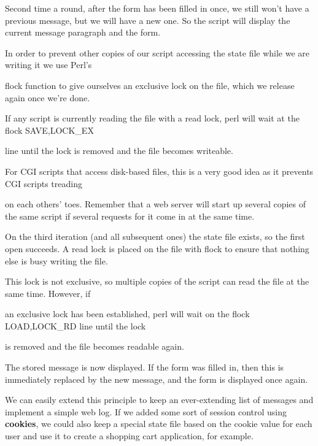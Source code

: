 \documentclass[a4paper,11pt]{book}
\begin{document}
\noindent 

\noindent Second time a round, after the form has been filled in once, we still won't have a previous message, but we will have a new one. So the script will display the current message paragraph and the form.

\noindent 

\noindent In order to prevent other copies of our script accessing the state file while we are writing it we use Perl's

\noindent flock function to give ourselves an exclusive lock on the file, which we release again once we're done.

\noindent If any script is currently reading the file with a read lock, perl will wait at the flock SAVE,LOCK\_EX

\noindent line until the lock is removed and the file becomes writeable.

\noindent 

\noindent For CGI scripts that access disk-based files, this is a very good idea as it prevents CGI scripts treading

\noindent on each others' toes. Remember that a web server will start up several copies of the same script if several requests for it come in at the same time.

\noindent 

\noindent On the third iteration (and all subsequent ones) the state file exists, so the first open succeeds. A read lock is placed on the file with flock to ensure that nothing else is busy writing the file.

\noindent 

\noindent This lock is not exclusive, so multiple copies of the script can read the file at the same time. However, if

\noindent an exclusive lock has been established, perl will wait on the flock LOAD,LOCK\_RD line until the lock

\noindent is removed and the file becomes readable again.

\noindent 

\noindent The stored message is now displayed. If the form was filled in, then this is immediately replaced by the new message, and the form is displayed once again.

\noindent 

\noindent We can easily extend this principle to keep an ever-extending list of messages and implement a simple web log. If we added some sort of session control using \textbf{cookies}, we could also keep a special state file based on the cookie value for each user and use it to create a shopping cart application, for example.
\end{document}
